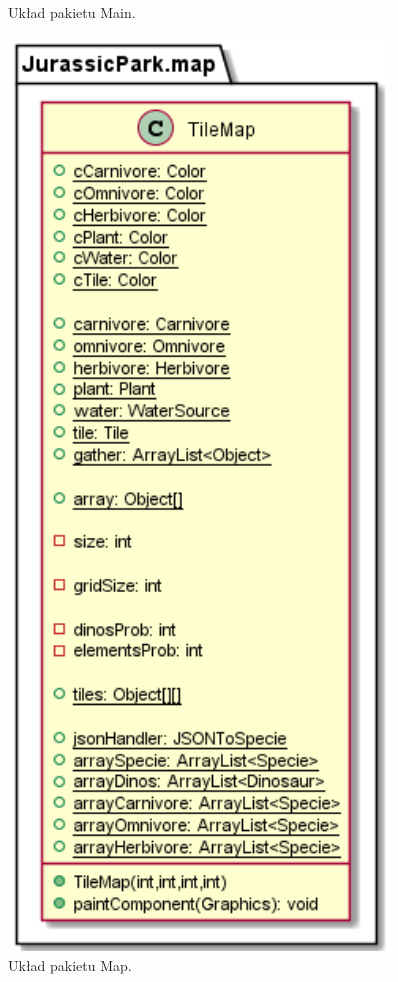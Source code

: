 \begin{figure}[h!]
\begin{minipage}{0.45\textwidth}
        \caption{Układ pakietu Main.}
    \end{minipage}\hfill
    \begin{minipage}{0.45\textwidth}
        \centering
        \includegraphics[width=0.9\textwidth]{images/class/map.png} %
        \caption{Układ pakietu Map.}
    \end{minipage}
\end{figure}


